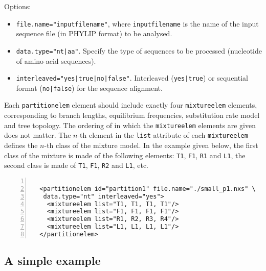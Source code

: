 \documentclass[a4paper,12pt]{article}
\newcommand{\x}[1]{\texttt{#1}}
\begin{document}
Options:
\begin{itemize}
\item \x{file.name="inputfilename"}, where \x{inputfilename} is the name of the input sequence file
  (in PHYLIP format) to be analysed.
\item \x{data.type="nt|aa"}. Specify the type of sequences to be processed (nucleotide of amino-acid sequences).
\item \x{interleaved="yes|true|no|false"}. Interleaved (\x{yes|true}) or sequential format
  (\x{no|false}) for the sequence alignment.
\end{itemize}

Each \x{partitionelem} element should include exactly four \x{mixtureelem} elements, corresponding to
branch lengths, equilibrium frequencies, substitution rate model and tree topology. The ordering of
in which the \x{mixtureelem} elements are given does not matter. The $n$-th element in the \x{list}
attribute of each \x{mixtureelem} defines the $n$-th class of the mixture model. In the example given
below, the first class of the mixture is made of the following elements: \x{T1}, \x{F1}, \x{R1} and
\x{L1}, the second class is made of \x{T1}, \x{F1}, \x{R2} and \x{L1}, etc.


\vspace{0.2cm}
\begin{Verbatim}[frame=single, label=Example of `partitionelem' component, samepage=true,
  baselinestretch=0.5, fontsize=\small, numbers=left]

  <partitionelem id="partition1" file.name="./small_p1.nxs" \
   data.type="nt" interleaved="yes">
    <mixtureelem list="T1, T1, T1, T1"/>
    <mixtureelem list="F1, F1, F1, F1"/>
    <mixtureelem list="R1, R2, R3, R4"/>
    <mixtureelem list="L1, L1, L1, L1"/>
  </partitionelem>

\end{Verbatim}

\subsection{A simple example}
\end{document}
